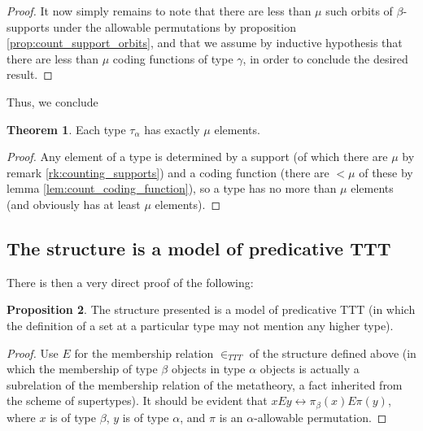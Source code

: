 \documentclass{article}
\theoremstyle{definition}
\newtheorem{theorem}{Theorem}[section]
\newtheorem{proposition}[theorem]{Proposition}
\theoremstyle{remark}
\begin{document}
{\begin{proof}
  It now simply remains to note that there are less than $\mu$ such orbits of $\beta$-supports under the allowable permutations by proposition \ref{prop:count_support_orbits}, and that we assume by inductive hypothesis that there are less than $\mu$ coding functions of type $\gamma$, in order to conclude the desired result.
\end{proof}


Thus, we conclude
\begin{theorem}\label{thm:count_elements}
Each type $\tau_\alpha$ has exactly $\mu$ elements.
\end{theorem}
\begin{proof}
Any element of a type is determined by a support (of which there are $\mu$ by remark \ref{rk:counting_supports}) and a coding function (there are $<\mu$ of these by lemma \ref{lem:count_coding_function}), so a type has no more than $\mu$ elements (and obviously has at least $\mu$ elements).
\end{proof}

\newpage
\subsection{The structure is a model of predicative TTT}\label{ss:predicative_ttt}

{There is then a very direct proof of the following:}
\begin{proposition}\label{prop:predicative_ttt}
  The structure presented is a model of predicative TTT (in which the definition of a set at a particular type may not mention any higher type).
\end{proposition}
\begin{proof}

Use $E$ for the membership relation $\in_{TTT}$ of the structure defined above (in which the membership of type $\beta$ objects in type $\alpha$ objects is actually a subrelation of the membership relation of the metatheory, a fact inherited from the scheme of supertypes).  It should be evident that $x E y \leftrightarrow \pi_\beta(x) E \pi(y)$,
where $x$ is of type $\beta$, $y$ is of type $\alpha$, and $\pi$ is an $\alpha$-allowable permutation.


\end{proof}}
\end{document}
